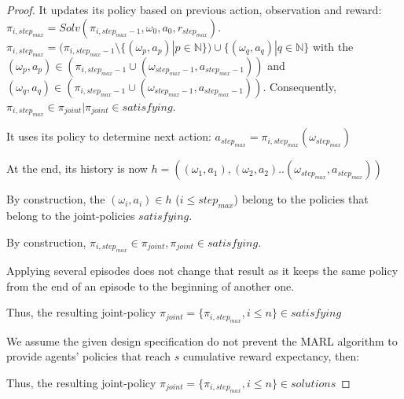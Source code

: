 \begin{proof}
    It updates its policy based on previous action, observation and reward: $\pi_{i,step_{max}} = Solv(\pi_{i,step_{max}-1}, \omega_0, a_0, r_{step_{max}})$.
    $\pi_{i,step_{max}} = (\pi_{i,step_{max}-1} \setminus \{(\omega_p, a_p) | p \in \mathbb{N}\}) \cup \{(\omega_q, a_q) | q \in \mathbb{N}\}$ with the $(\omega_p, a_p) \in (\pi_{i,step_{max}-1} \cup {(\omega_{step_{max}-1}, a_{step_{max}-1})})$ and $(\omega_q, a_q) \in (\pi_{i,step_{max}-1} \cup {(\omega_{step_{max}-1}, a_{step_{max}-1})})$. Consequently, $\pi_{i,step_{max}} \in \pi_{joint} | \pi_{joint} \in satisfying$.

    It uses its policy to determine next action: $a_{step_{max}} = \pi_{i,step_{max}}(\omega_{step_{max}})$

    At the end, its history is now $h = ((\omega_1, a_1), (\omega_2, a_2)..(\omega_{step_{max}}, a_{step_{max}}))$

    By construction, the $(\omega_i,a_i) \in h$ ($i \leq step_{max}$) belong to the policies that belong to the joint-policies $satisfying$.
    
    By construction, $\pi_{i,step_{max}} \in \pi_{joint}, \pi_{joint} \in satisfying$.

    Applying several episodes does not change that result as it keeps the same policy from the end of an episode to the beginning of another one.

    Thus, the resulting joint-policy $\pi_{joint} = \{\pi_{i,step_{max}}, i \leq n\} \in satisfying$

    We assume the given design specification do not prevent the MARL algorithm to provide agents' policies that reach $s$ cumulative reward expectancy, then:

    Thus, the resulting joint-policy $\pi_{joint} = \{\pi_{i,step_{max}}, i \leq n\} \in solutions$

\end{proof}